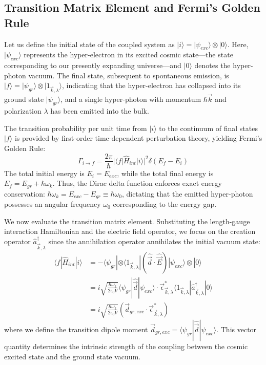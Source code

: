 \subsection{Transition Matrix Element and Fermi's Golden Rule}
Let us define the initial state of the coupled system as $|i\rangle = |\psi_{exc}\rangle \otimes |0\rangle$. Here, $|\psi_{exc}\rangle$ represents the hyper-electron in its excited cosmic state---the state corresponding to our presently expanding universe---and $|0\rangle$ denotes the hyper-photon vacuum. The final state, subsequent to spontaneous emission, is $|f\rangle = |\psi_{gr}\rangle \otimes |1_{\vec{k}, \lambda}\rangle$, indicating that the hyper-electron has collapsed into its ground state $|\psi_{gr}\rangle$, and a single hyper-photon with momentum $\hbar\vec{k}$ and polarization $\lambda$ has been emitted into the bulk.

The transition probability per unit time from $|i\rangle$ to the continuum of final states $|f\rangle$ is provided by first-order time-dependent perturbation theory, yielding Fermi's Golden Rule:
\begin{equation}
    \Gamma_{i \to f} = \frac{2\pi}{\hbar} |\langle f | \hat{H}_{int} | i \rangle|^2 \delta(E_f - E_i)
\end{equation}
The total initial energy is $E_i = E_{exc}$, while the total final energy is $E_f = E_{gr} + \hbar \omega_k$. Thus, the Dirac delta function enforces exact energy conservation: $\hbar \omega_k = E_{exc} - E_{gr} \equiv \hbar \omega_{0}$, dictating that the emitted hyper-photon possesses an angular frequency $\omega_0$ corresponding to the energy gap.

We now evaluate the transition matrix element. Substituting the length-gauge interaction Hamiltonian and the electric field operator, we focus on the creation operator $\hat{a}_{\vec{k}, \lambda}^\dagger$ since the annihilation operator annihilates the initial vacuum state:
\begin{align}
    \langle f | \hat{H}_{int} | i \rangle &= - \langle \psi_{gr} | \otimes \langle 1_{\vec{k}, \lambda} | \left( \hat{\vec{d}} \cdot \hat{\vec{E}} \right) |\psi_{exc}\rangle \otimes |0\rangle \nonumber \\
    &= i \sqrt{\frac{\hbar \omega_k}{2 \epsilon_0 V}} \langle \psi_{gr} | \hat{\vec{d}} | \psi_{exc} \rangle \cdot \vec{\epsilon}_{\vec{k}, \lambda}^* \langle 1_{\vec{k}, \lambda} | \hat{a}_{\vec{k}, \lambda}^\dagger | 0 \rangle \nonumber \\
    &= i \sqrt{\frac{\hbar \omega_k}{2 \epsilon_0 V}} \left( \vec{d}_{gr, exc} \cdot \vec{\epsilon}_{\vec{k}, \lambda}^* \right)
\end{align}
where we define the transition dipole moment $\vec{d}_{gr, exc} = \langle \psi_{gr} | \hat{\vec{d}} | \psi_{exc} \rangle$. This vector quantity determines the intrinsic strength of the coupling between the cosmic excited state and the ground state vacuum.


